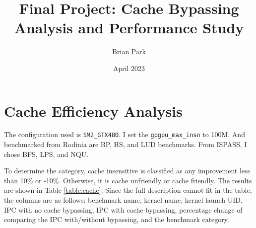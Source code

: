 \documentclass{article}
\title{Final Project: Cache Bypassing Analysis and Performance Study}
\author{Brian Park}
\affil{North Carolina State University, Computer Engineering 786}
\date{April 2023}
\begin{document}
\maketitle

\section{Cache Efficiency Analysis}

The configuration used is \verb|SM2_GTX480|. I set the \verb|gpgpu_max_insn| to 100M. And benchmarked from Rodinia are BP, HS, and LUD benchmarks. From ISPASS, I chose BFS, LPS, and NQU.

To determine the category, cache insensitive is classified as any improvement less than 10\% or -10\%. Otherwise, it is cache unfriendly or cache friendly. The results are shown in Table \ref{table:cache}. Since the full description cannot fit in the table, the columns are as follows: benchmark name, kernel name, kernel launch UID, IPC with no cache bypassing, IPC with cache bypassing, percentage change of comparing the IPC with/without bypassing, and the benchmark category. 
\end{document}
